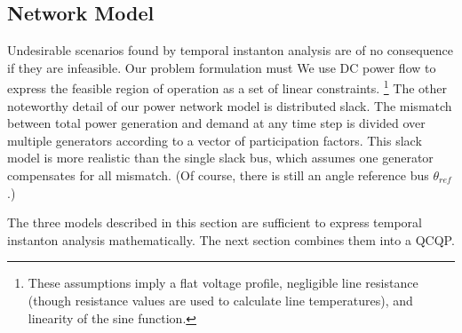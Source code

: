 \documentclass[journal,twoside]{IEEEtran}
\begin{document}
\subsection{Network Model}\label{sec:models-network}
Undesirable scenarios found by temporal instanton analysis are of no consequence if they are infeasible. Our problem formulation must We use DC power flow to express the feasible region of operation as a set of linear constraints. \footnote{These assumptions imply a flat voltage profile, negligible line resistance (though resistance values are used to calculate line temperatures), and linearity of the sine function.} The other noteworthy detail of our power network model is distributed slack. The mismatch between total power generation and demand at any time step is divided over multiple generators according to a vector of participation factors. This slack model is more realistic than the single slack bus, which assumes one generator compensates for all mismatch. (Of course, there is still an angle reference bus $\theta_{ref}$.)

The three models described in this section are sufficient to express temporal instanton analysis mathematically. The next section combines them into a QCQP.
\end{document}
